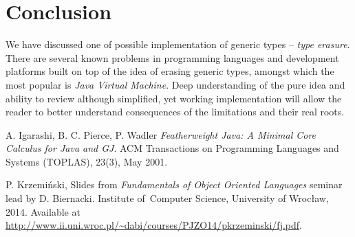 \documentclass{article}[12pt]
\begin{document}
\section{Conclusion}

We have discussed one of possible implementation of generic
types -- \emph{type erasure}. There are several known problems
in programming languages and development platforms built on top
of the idea of erasing generic types, amongst which the most
popular is \emph{Java Virtual Machine}. Deep understanding of
the pure idea and ability to review although simplified,
yet working implementation will allow the reader to better
understand consequences of the limitations and their real roots. 

\begin{thebibliography}{1}

   A. Igarashi, B. C. Pierce, P. Wadler
  {\em Featherweight Java: A Minimal Core Calculus for Java and GJ}.
  ACM Transactions on Programming Languages and Systems (TOPLAS), 23(3), May 2001.

   P. Krzemiński, Slides from {\em Fundamentals of
  Object Oriented Languages} seminar lead by D. Biernacki.
  Institute of~Computer Science, University of Wrocław, 2014.
  Available at
  \url{http://www.ii.uni.wroc.pl/~dabi/courses/PJZO14/pkrzeminski/fj.pdf}.

\end{thebibliography}
\end{document}
